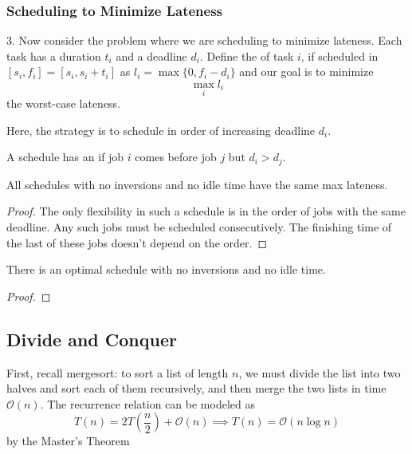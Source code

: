 \documentclass[12pt]{scrartcl}
\begin{document}
\subsubsection{Scheduling to Minimize Lateness}

3. Now consider the problem where we are scheduling to minimize lateness. Each task has a duration 
$t_i$ and a deadline $d_i$. Define the  of task $i$, if scheduled in 
$[s_i, f_i] = [s_i, s_i + t_i]$ as $l_i = \max\{0, f_i - d_i\}$ and our goal is to minimize
\[\max_i l_i\]
the worst-case lateness. 

\begin{note}
  Here, the strategy is to schedule in order of increasing deadline $d_i$. 
\end{note}

\begin{definition}
   A schedule has an  if job $i$ comes before job $j$ but $d_i > d_j$. 
\end{definition}

\begin{lemma}
  All schedules with no inversions and no idle time have the same max lateness.
  \begin{proof}
    The only flexibility in such a schedule is in the order of jobs with the same deadline. Any such 
    jobs must be scheduled consecutively. The finishing time of the last of these jobs doesn't depend on the order. 
  \end{proof}
\end{lemma}

\begin{lemma}
  There is an optimal schedule with no inversions and no idle time. 
  \begin{proof}
    
  \end{proof}
\end{lemma}

\subsection{Divide and Conquer}

\begin{note}
  First, recall mergesort: to sort a list of length $n$, we must divide the list into two halves and sort 
  each of them recursively, and then merge the two lists in time $\mathcal{O}(n)$. The recurrence relation can be modeled as 
  \[T(n) = 2T(\frac{n}{2}) + \mathcal{O}(n) \implies T(n) = \mathcal{O}(n \log n)\]
  by the Master's Theorem
\end{note}
\end{document}
